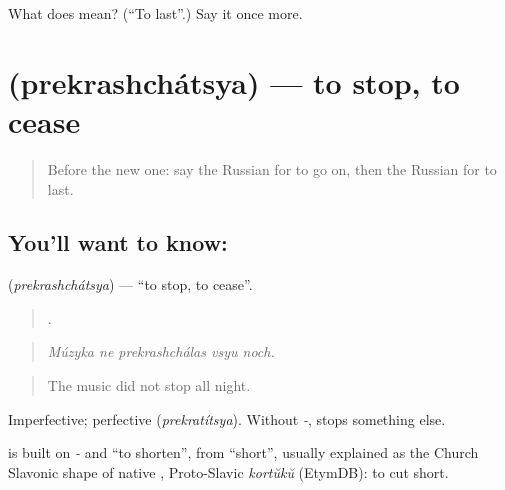 \begin{tcolorbox}[breakable,colback=teal!4,colframe=teal!35!black,title={Before you move on}]
What does  mean? (\textquotedblleft{}To last\textquotedblright{}.) Say it once more.
\end{tcolorbox}
\section[\texorpdfstring{\ru{прекращаться} (prekrashchátsya)}{прекращаться (prekrashchátsya)}]{ (prekrashchátsya) — to stop, to cease}

\label{lesson:RU-C273-prekrashchatsya}



\begin{quote}
Before the new one: say the Russian for to go on, then the Russian for to last.
\end{quote}

\subsection*{You'll want to know: }
\textbf{} (\emph{prekrashchátsya}) — \textquotedblleft{}to stop, to cease\textquotedblright{}.

\begin{quote}
    .
\end{quote}

\begin{quote}
\emph{Múzyka ne prekrashchálas vsyu noch.}
\end{quote}

\begin{quote}
The music did not stop all night.
\end{quote}

Imperfective; perfective \emph{} (\emph{prekratítsya}). Without \emph{-}, \emph{} stops something else.

\begin{cousinweb}
\emph{} is built on \emph{-} and \emph{} \textquotedblleft{}to shorten\textquotedblright{}, from \emph{} \textquotedblleft{}short\textquotedblright{}, usually explained as the Church Slavonic shape of native \emph{}, Proto-Slavic \emph{kortŭkŭ} (EtymDB): to cut short.
\end{cousinweb}

